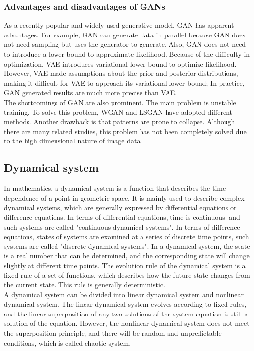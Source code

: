 \documentclass[11pt,a4paper]{article}
\begin{document}
\subsubsection{Advantages and disadvantages of GANs}
As a recently popular and widely used generative model, GAN has apparent advantages. For example, GAN can generate data in parallel because GAN does not need sampling but uses the generator to generate. Also, GAN does not need to introduce a lower bound to approximate likelihood. Because of the difficulty in optimization, VAE\citep{doersch2016tutorial} introduces variational lower bound to optimize likelihood. However, VAE made assumptions about the prior and posterior distributions, making it difficult for VAE to approach its variational lower bound; In practice, GAN generated results are much more precise than VAE.
\\
\newline
The shortcomings of GAN are also prominent. The main problem is unstable training. To solve this problem, WGAN and LSGAN have adopted different methods. Another drawback is that patterns are prone to collapse. Although there are many related studies, this problem has not been completely solved due to the high dimensional nature of image data.
\subsection{Dynamical system}
In mathematics, a dynamical system is a function that describes the time dependence of a point in geometric space. It is mainly used to describe complex dynamical systems, which are generally expressed by differential equations or difference equations. In terms of differential equations, time is continuous, and such systems are called "continuous dynamical systems". In terms of difference equations, states of systems are examined at a series of discrete time points, such systems are called "discrete dynamical systems". In a dynamical system, the state is a real number that can be determined, and the corresponding state will change slightly at different time points. The evolution rule of the dynamical system is a fixed rule of a set of functions, which describes how the future state changes from the current state. This rule is generally deterministic.
\\
\newline
A dynamical system can be divided into linear dynamical system and nonlinear dynamical system. The linear dynamical system evolves according to fixed rules, and the linear superposition of any two solutions of the system equation is still a solution of the equation. However, the nonlinear dynamical system does not meet the superposition principle, and there will be random and unpredictable conditions, which is called chaotic system\citep{arrowsmith1990introduction}.
\end{document}

